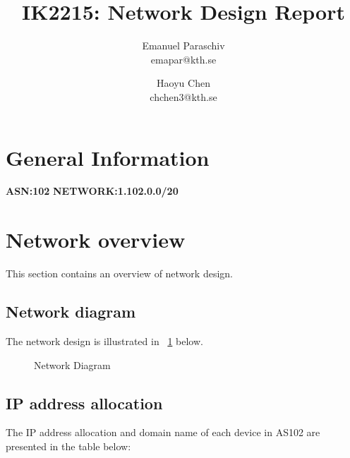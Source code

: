 \documentclass{article}
\title{IK2215: Network Design Report}
\author{
{Emanuel Paraschiv}\\
{emapar@kth.se}
\and
{Haoyu Chen}\\
{chchen3@kth.se}
}
\date{}
\begin{document}
\maketitle
\thispagestyle{fancy}

\section{General Information}
\textbf{ASN:102} 
\tab
\textbf{NETWORK:1.102.0.0/20} 

\section{Network overview}
This section contains an overview of network design.



\subsection{Network diagram}
The network design is illustrated in \figureautorefname~\ref{fig:your_figure} below.
\begin{figure}[h]
    \centering
    
    \caption{Network Diagram}
    \label{fig:your_figure}
\end{figure}

\subsection{IP address allocation}
The IP address allocation and domain name of each device in AS102 are presented in the table below:
\end{document}

